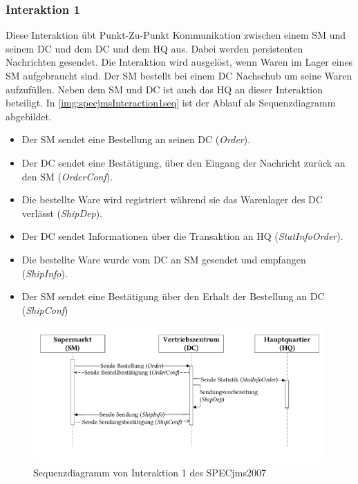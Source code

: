 \subsubsection{Interaktion 1}
\label{sec:interaction1desc}
Diese Interaktion übt Punkt-Zu-Punkt Kommunikation zwischen einem SM und seinem DC und dem DC und dem HQ aus. Dabei werden persistenten Nachrichten gesendet. Die Interaktion wird ausgelöst, wenn Waren im Lager eines SM aufgebraucht sind. Der SM bestellt bei einem DC Nachschub um seine Waren aufzufüllen. Neben dem SM und DC ist auch das HQ an dieser Interaktion beteiligt. In \autoref{img:specjmsInteraction1seq} ist der Ablauf als Sequenzdiagramm abgebildet. 
\begin{itemize}
    \item Der SM sendet eine Bestellung an seinen DC (\emph{Order}).
    \item Der DC sendet eine Bestätigung, über den Eingang der Nachricht zurück an den SM (\emph{OrderConf}).
    \item Die bestellte Ware wird registriert während sie das Warenlager des DC verlässt (\emph{ShipDep}).
    \item Der DC sendet Informationen über die Transaktion an HQ (\emph{StatInfoOrder}).
    \item Die bestellte Ware wurde vom DC an SM gesendet und empfangen (\emph{ShipInfo}).
    \item Der SM sendet eine Bestätigung über den Erhalt der Bestellung an DC (\emph{ShipConf})
\end{itemize}

\begin{figure}
\center
  \includegraphics[width=1\textwidth]{images/evaluation/specjms/evaluationInteraktion1seq.pdf}
  \caption{Sequenzdiagramm von Interaktion 1 des SPECjms2007}
  \label{img:specjmsInteraction1seq}
\end{figure}

